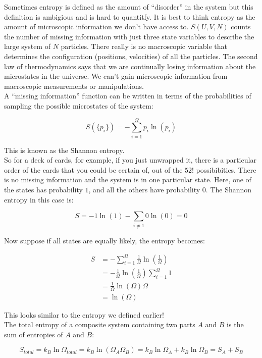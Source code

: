 Sometimes entropy is defined as the amount of ``disorder'' in the system but this definition is ambigious and is hard to quantitfy. It is best to think entropy as the amount of microscopic information we don’t have access to. $S(U,V,N)$ counts the number of missing information with just three state variables to describe the large system of $N$ particles. There really is no macroscopic variable that determines the configuration (positions, velocities) of all the particles. The second law of thermodynamics says that we are continually losing information about the microstates in the universe. We can’t gain microscopic information from macroscopic measurements or manipulations. \\

A ``missing information'' function can be written in terms of the probabilities of sampling the possible microstates of the system:

\[S(\{p_i\})=-\sum_{i=1}^\Omega p_i \ln(p_i)\]

This is known as the Shannon entropy. \\

So for a deck of cards, for example, if you just unwrapped it, there is a particular order of the cards that you could be certain of, out of the $52!$ possibibities. There is no missing information and the system is in one particular state. Here, one of the states has probability $1$, and all the others have probability $0$. The Shannon entropy in this case is:

\[S=-1\ln(1)-\sum_{i\ne1}0\ln(0)=0\]

Now suppose if all states are equally likely, the entropy becomes:

\begin{align*}
	S&=-\sum_{i=1}^\Omega \frac{1}{\Omega} \ln\left( \frac{1}{\Omega} \right) \\
	&=-\frac{1}{\Omega} \ln\left( \frac{1}{\Omega} \right) \sum_{i=1}^\Omega 1 \\
	&=\frac{1}{\Omega} \ln\left( \Omega \right) \Omega \\
	&=\ln\left( \Omega \right)
\end{align*}

This looks similar to the entropy we defined earlier! \\

The total entropy of a composite system containing two parts $A$ and $B$ is the sum of entropies of $A$ and $B$:

\[S_{total}=k_B\ln\Omega_{total}=k_B\ln(\Omega_A\Omega_B)=k_B\ln\Omega_A+k_B\ln\Omega_B=S_A+S_B\]

